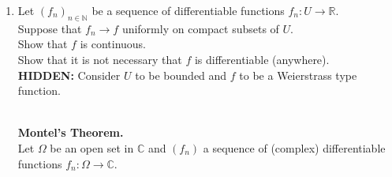 \documentclass[12pt]{article}
\theoremstyle{definition}
\numberwithin{thm}{section}
\newtheorem{defn}[thm]{Definition}
\newcommand{\hint}[1]{\textbf{HIDDEN:} {\color[rgb]{0.95, 0.95, 0.95}#1}}
\newenvironment{blockquote}
{\begin{mdframed}[skipabove=0pt, skipbelow=0pt, innertopmargin=4pt, innerbottommargin=4pt, bottomline=false,topline=false,rightline=false, linewidth=2pt]}
{\end{mdframed}}
\begin{document}
\begin{enumerate}
	\begin{defn}[Power series representation]
		\begin{blockquote}
		A function $f:U \to \mathbb{R}$ is said to \emph{admit a power series representation at $x_0$} exists a neighbourhood $B_r(x_0) \subset U$ and a sequence of real numbers $(a_n)$ such that 
		\begin{equation*} 
			f(x) = a_0 + a_1(x - x_0) + a_2(x - x_0)^2 + \cdots
		\end{equation*}
		for all $x \in B_r(x_0).$\\~\\
		An entirely analogous definition is there for $f:\Omega \to \mathbb{C}$ as well.
		\end{blockquote}
	\end{defn}
	It can be shown that such a function must be infinitely differentiable at $x_0$ and that $a_n = \dfrac{f^{(n)}(x_0)}{n!}.$\\~\\
	Construct a function $f:U \to \mathbb{R}$ which is infinitely differentiable but there exists $x_0 \in U$ such that $f$ does not admit a power series representation at $x_0.$\\
	(In fact, one can find a function which does not admit a power series representation \emph{anywhere}.)\\
	\begin{blockquote}	
		Let $f:\Omega \to \mathbb{C}$ be complex differentiable. \\
		Then, for every $z_0 \in \Omega,$ $f$ admits a power series representation. Moreover, this representation is valid on the largest open disc centered at $z_0$ contained in $\Omega.$
	\end{blockquote}
	\item Let $(f_n)_{n \in \mathbb{N}}$ be a sequence of differentiable functions $f_n:U \to \mathbb{R}.$\\
	Suppose that $f_n\to f$ uniformly on compact subsets of $U.$\\
	Show that $f$ is continuous.\\
	Show that it is not necessary that $f$ is differentiable (anywhere).\\
	\hint{Consider $U$ to be bounded and $f$ to be a Weierstrass type function.}\\~\\
	\begin{blockquote}
		\textbf{Montel's Theorem.}\\
		Let $\Omega$ be an open set in $\mathbb{C}$ and $(f_n)$ a sequence of (complex) differentiable functions $f_n:\Omega \to \mathbb{C}.$\\

\end{blockquote}
\end{enumerate}
\end{document}
